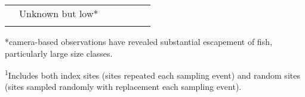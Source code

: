 \documentclass[]{article}
\begin{document}
\begin{longtable}[]{@{}lllllll@{}}
\begin{minipage}[t]{0.12\columnwidth}
\end{minipage} & \begin{minipage}[t]{0.12\columnwidth}\raggedright\strut
Unknown but low*\strut
\end{minipage}\tabularnewline
\begin{minipage}[t]{0.12\columnwidth}\raggedright\strut
\strut
\end{minipage} & \begin{minipage}[t]{0.12\columnwidth}\raggedright\strut
\strut
\end{minipage} & \begin{minipage}[t]{0.12\columnwidth}\raggedright\strut
\strut
\end{minipage} & \begin{minipage}[t]{0.12\columnwidth}\raggedright\strut
\strut
\end{minipage} & \begin{minipage}[t]{0.12\columnwidth}\raggedright\strut
\strut
\end{minipage} & \begin{minipage}[t]{0.12\columnwidth}\raggedright\strut
\strut
\end{minipage} & \begin{minipage}[t]{0.12\columnwidth}\raggedright\strut
\strut
\end{minipage}\tabularnewline
\bottomrule
\end{longtable}

*camera-based observations have revealed substantial escapement of fish,
particularly large size classes.

\textsuperscript{1}Includes both index sites (sites repeated each
sampling event) and random sites (sites sampled randomly with
replacement each sampling event).
\end{document}
